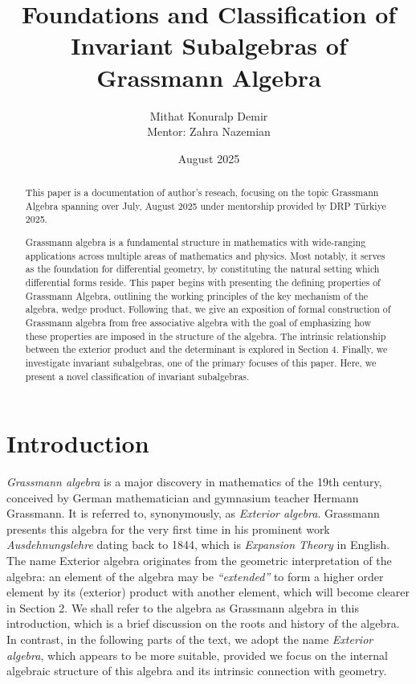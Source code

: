 \documentclass[12pt]{article}
\title{Foundations and Classification of Invariant Subalgebras of Grassmann Algebra}
\author{Mithat Konuralp Demir\\
\small Mentor: Zahra Nazemian}
\date{August 2025}
\numberwithin{theorem}{section}
\numberwithin{equation}{theorem}
\begin{document}
\maketitle

\begin{abstract}
This paper is a documentation of author's reseach, focusing on the topic Grassmann Algebra spanning over July, August 2025 under mentorship provided by DRP Türkiye 2025.

Grassmann algebra is a fundamental structure in mathematics with wide-ranging applications across multiple areas of mathematics and physics. Most notably, it serves as the foundation for differential geometry, by constituting the natural setting which differential forms reside. This paper begins with presenting the defining properties of Grassmann Algebra, outlining the working principles of the key mechanism of the algebra, wedge product. Following that, we give an exposition of formal construction of Grassmann algebra from free associative algebra with the goal of emphasizing how these properties are imposed in the structure of the algebra. The intrinsic relationship between the exterior product and the determinant is explored in Section 4. Finally, we investigate invariant subalgebras, one of the primary focuses of this paper. Here, we present a novel classification of invariant subalgebras. 
\end{abstract}

\tableofcontents


\section{Introduction}

\hspace*{\parindent} \emph{Grassmann algebra} is a major discovery in mathematics of the 19th century, conceived by German mathematician and gymnasium teacher Hermann Grassmann. It is referred to, synonymously, as \emph{Exterior algebra}. Grassmann presents this algebra for the very first time in his prominent work \emph{Ausdehnungslehre} dating back to 1844, which is \emph{Expansion Theory} in English. The name Exterior algebra originates from the geometric interpretation of the algebra: an element of the algebra may be \emph{“extended”} to form a higher order element by its (exterior) product with another element, which will become clearer in Section 2. We shall refer to the algebra as Grassmann algebra in this introduction, which is a brief discussion on the roots and history of the algebra. In contrast, in the following parts of the text, we adopt the name \emph{Exterior algebra}, which appears to be more suitable, provided we focus on the internal algebraic structure of this algebra and its intrinsic connection with geometry.
\end{document}
